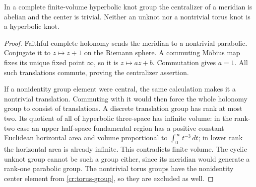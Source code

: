 \begin{lemma}\label{cr:hyperbolic-centralizer}
In a complete finite-volume hyperbolic knot group the centralizer of a meridian is abelian and the center is trivial. Neither an unknot nor a nontrivial torus knot is a hyperbolic knot.
\end{lemma}
\begin{proof}
Faithful complete holonomy sends the meridian to a nontrivial parabolic. Conjugate it to $z\mapsto z+1$ on the Riemann sphere. A commuting M\"obius map fixes its unique fixed point $\infty$, so it is $z\mapsto az+b$. Commutation gives $a=1$. All such translations commute, proving the centralizer assertion.

If a nonidentity group element were central, the same calculation makes it a nontrivial translation. Commuting with it would then force the whole holonomy group to consist of translations. A discrete translation group has rank at most two. Its quotient of all of hyperbolic three-space has infinite volume: in the rank-two case an upper half-space fundamental region has a positive constant Euclidean horizontal area and volume proportional to $\int_0^\infty t^{-3}\,dt$; in lower rank the horizontal area is already infinite. This contradicts finite volume. The cyclic unknot group cannot be such a group either, since its meridian would generate a rank-one parabolic group. The nontrivial torus groups have the nonidentity center element from \eqref{cr:torus-group}, so they are excluded as well.
\end{proof}

